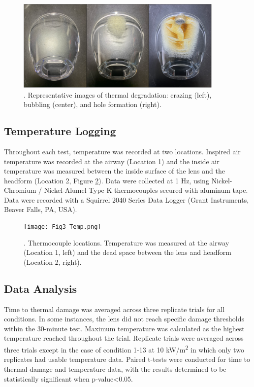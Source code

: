 \documentclass[sn-mathphys]{sn-jnl}%
\theoremstyle{thmstyleone}%
\theoremstyle{thmstyletwo}%
\theoremstyle{thmstylethree}%
\begin{document}
\begin{figure}[h]%
\centering
\includegraphics[width=0.9\textwidth]{Fig2_ThermalDeg.png}
\caption{. Representative images of thermal degradation: crazing (left), bubbling (center), and hole formation (right).}\label{fig2}
\end{figure}

\subsection{Temperature Logging}\label{subsec6}
Throughout each test, temperature was recorded at two locations. Inspired air temperature was recorded at the airway (Location 1) and the inside air temperature was measured between the inside surface of the lens and the headform (Location 2, Figure \ref{fig3}). Data were collected at 1 Hz, using Nickel-Chromium / Nickel-Alumel Type K thermocouples secured with aluminum tape. Data were recorded with a Squirrel 2040 Series Data Logger (Grant Instruments, Beaver Falls, PA, USA).

\begin{figure}[h]%
\centering
\texttt{[image: Fig3\_Temp.png]}
\caption{. Thermocouple locations. Temperature was measured at the airway (Location 1, left) and the dead space between the lens and headform (Location 2, right).}\label{fig3}
\end{figure}

\subsection{Data Analysis}\label{subsec7}
Time to thermal damage was averaged across three replicate trials for all conditions. In some instances, the lens did not reach specific damage thresholds within the 30-minute test. Maximum temperature was calculated as the highest temperature reached throughout the trial. Replicate trials were averaged across three trials except in the case of condition 1-13 at 10 kW/m\textsuperscript{2} in which only two replicates had usable temperature data. Paired t-tests were conducted for time to thermal damage and temperature data, with the results determined to be statistically significant when p-value\textless 0.05.
\end{document}
